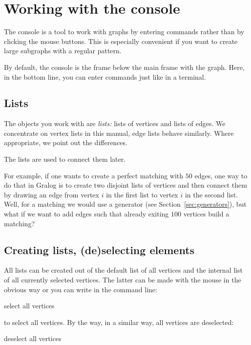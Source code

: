 \section{Working with the console}

The console is a tool to work with graphs by entering commands rather
than by clicking the mouse buttons. This is especially convenient if
you want to create large subgraphs with a regular pattern.

By default, the console is the frame below the main frame with the
graph. Here, in the bottom line, you can enter commands just like in a
terminal.

\subsection{Lists}

The objects you work with are \emph{lists:} lists of vertices and
lists of edges. We concentrate on vertex lists in this manual, edge
lists behave similarly. Where appropriate, we point out the
differences.

The lists are used to connect them later.


\begin{example}
  For example, if one wants to create a perfect matching with $50$
  edges, one way to do that in Gralog is to create two disjoint lists
  of vertices and then connect them by drawing an edge from vertex $i$
  in the first list to vertex $i$ in the second list. Well, for a
  matching we would use a generator (see
  Section~\ref{sec:generators}), but what if we want to add edges such
  that already exiting $100$ vertices build a matching?
  \label{ex:running}
\end{example}


\subsection{Creating lists, (de)selecting elements}

All lists can be created out of the default list of all
vertices and the internal list of all currently selected vertices. The
latter can be made with the mouse in the obvious way or you can write
in the command line:
\\\begin{tcolorbox}
  select all vertices
\end{tcolorbox}
\noindent
to select all vertices. By the way, in a similar way, all vertices are
deselected:
\\\begin{tcolorbox}
deselect all vertices
\end{tcolorbox}

